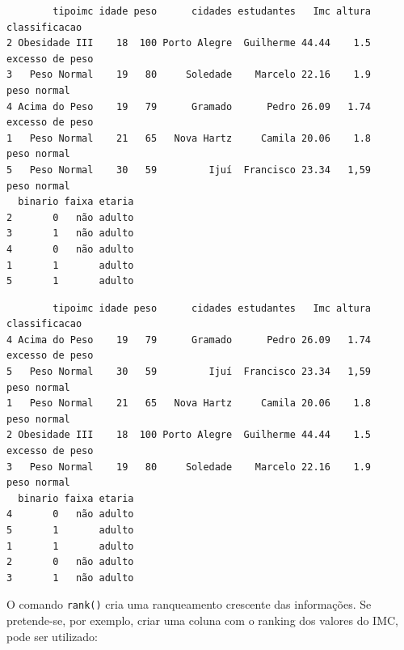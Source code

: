 \documentclass[12pt,brazil,oneside]{book}
\newenvironment{Shaded}{\begin{snugshade}}{\end{snugshade}}
\newcommand{\CommentTok}[1]{\textcolor[rgb]{0.56,0.35,0.01}{\textit{#1}}}
\newcommand{\DataTypeTok}[1]{\textcolor[rgb]{0.13,0.29,0.53}{#1}}
\newcommand{\KeywordTok}[1]{\textcolor[rgb]{0.13,0.29,0.53}{\textbf{#1}}}
\newcommand{\NormalTok}[1]{#1}
\newcommand{\OperatorTok}[1]{\textcolor[rgb]{0.81,0.36,0.00}{\textbf{#1}}}
\newcommand{\OtherTok}[1]{\textcolor[rgb]{0.56,0.35,0.01}{#1}}
\begin{document}
\begin{Shaded}
\end{Shaded}

\begin{verbatim}
        tipoimc idade peso      cidades estudantes   Imc altura   classificacao
2 Obesidade III    18  100 Porto Alegre  Guilherme 44.44    1.5 excesso de peso
3   Peso Normal    19   80     Soledade    Marcelo 22.16    1.9     peso normal
4 Acima do Peso    19   79      Gramado      Pedro 26.09   1.74 excesso de peso
1   Peso Normal    21   65   Nova Hartz     Camila 20.06    1.8     peso normal
5   Peso Normal    30   59         Ijuí  Francisco 23.34   1,59     peso normal
  binario faixa etaria
2       0   não adulto
3       1   não adulto
4       0   não adulto
1       1       adulto
5       1       adulto
\end{verbatim}

\begin{Shaded}
\end{Shaded}

\begin{verbatim}
        tipoimc idade peso      cidades estudantes   Imc altura   classificacao
4 Acima do Peso    19   79      Gramado      Pedro 26.09   1.74 excesso de peso
5   Peso Normal    30   59         Ijuí  Francisco 23.34   1,59     peso normal
1   Peso Normal    21   65   Nova Hartz     Camila 20.06    1.8     peso normal
2 Obesidade III    18  100 Porto Alegre  Guilherme 44.44    1.5 excesso de peso
3   Peso Normal    19   80     Soledade    Marcelo 22.16    1.9     peso normal
  binario faixa etaria
4       0   não adulto
5       1       adulto
1       1       adulto
2       0   não adulto
3       1   não adulto
\end{verbatim}

O comando \texttt{rank()} cria uma ranqueamento crescente das informações. Se pretende-se, por exemplo, criar uma coluna com o ranking dos valores do IMC, pode ser utilizado:
\end{document}
